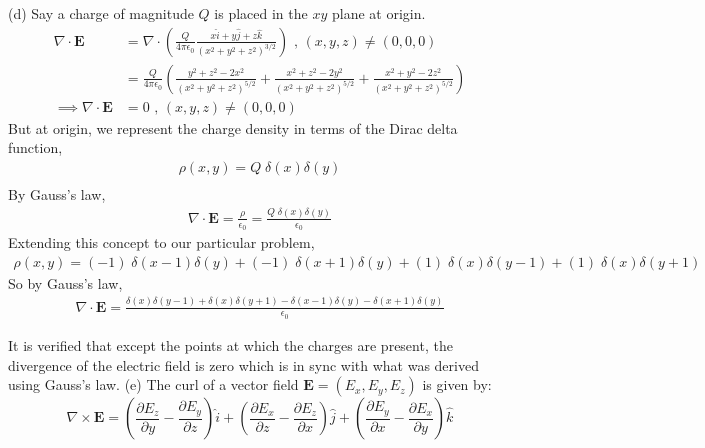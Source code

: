 \documentclass[12pt]{article}
\providecommand{\brak}[1]{\ensuremath{\left(#1\right)}}
\begin{document}
(d) Say a charge of magnitude $Q$ is placed in the $xy$ plane at origin.
\begin{align*}
    \nabla \cdot \mathbf{E} &= \nabla \cdot \brak{\frac{Q}{4\pi\epsilon_0} \frac{x\hat{i} + y\hat{j} + z\hat{k}}{\brak{x^2 + y^2 + z^2}^{3/2}}} \text{ , } \brak{x, y, z} \neq \brak{0, 0, 0}\\
    &= \frac{Q}{4\pi\epsilon_0} \brak{\frac{y^2 + z^2 - 2x^2}{\brak{x^2 + y^2 + z^2}^{5/2}} + \frac{x^2 + z^2 - 2y^2}{\brak{x^2 + y^2 + z^2}^{5/2}} + \frac{x^2 + y^2 - 2z^2}{\brak{x^2 + y^2 + z^2}^{5/2}}}\\
    \implies \nabla \cdot \mathbf{E} &= 0 \text{ , } \brak{x, y, z} \neq \brak{0, 0, 0}
\end{align*}
But at origin, we represent the charge density in terms of the Dirac delta function,
\begin{align*}
    \rho\brak{x, y} = Q\;\delta\brak{x}\delta\brak{y}\\
\end{align*}
By Gauss's law,
\begin{align*}
    \nabla \cdot \mathbf{E} = \frac{\rho}{\epsilon_0} = \frac{Q\;\delta\brak{x}\delta\brak{y}}{\epsilon_0}
\end{align*}
Extending this concept to our particular problem,
\begin{align*}
    \rho\brak{x, y} = \brak{-1} \; \delta\brak{x - 1}\delta\brak{y} + \brak{-1} \; \delta\brak{x + 1}\delta\brak{y} + \brak{1} \; \delta\brak{x}\delta\brak{y - 1} + \brak{1} \; \delta\brak{x}\delta\brak{y + 1}
\end{align*}
So by Gauss's law,
\begin{align*}
    \nabla \cdot \mathbf{E} = \frac{\delta\brak{x}\delta\brak{y - 1} + \delta\brak{x}\delta\brak{y + 1} - \delta\brak{x - 1}\delta\brak{y} - \delta\brak{x + 1}\delta\brak{y} }{\epsilon_0}
\end{align*}

It is verified that except the points at which the charges are present, the divergence of the electric field is zero which is in sync with what was derived using Gauss's law.
\newline
\newline
(e)
The curl of a vector field $\mathbf{E} = (E_x, E_y, E_z)$ is given by:
\begin{equation}
    \nabla \times \mathbf{E} = 
    \brak{\frac{\partial E_z}{\partial y} - \frac{\partial E_y}{\partial z}} \hat{i} + \brak{\frac{\partial E_x}{\partial z} - \frac{\partial E_z}{\partial x}} \hat{j} + \brak{\frac{\partial E_y}{\partial x} - \frac{\partial E_x}{\partial y}} \hat{k}
\end{equation}
\end{document}
